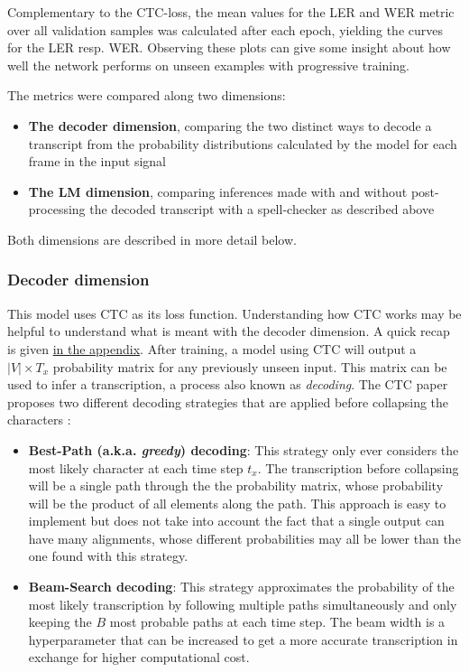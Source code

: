 Complementary to the \ac{CTC}-loss, the mean values for the \ac{LER} and \ac{WER} metric over all validation samples was calculated after each epoch, yielding the curves for the \ac{LER} resp. \ac{WER}. Observing these plots can give some insight about how well the network performs on unseen examples with progressive training.

The metrics were compared along two dimensions:

\begin{itemize}
	\item \textbf{The decoder dimension}, comparing the two distinct ways to decode a transcript from the probability distributions calculated by the model for each frame in the input signal
	\item \textbf{The LM dimension}, comparing inferences made with and without post-processing the decoded transcript with a spell-checker as described above
\end{itemize}

Both dimensions are described in more detail below.

\subsubsection{Decoder dimension}

This model uses \ac{CTC} as its loss function. Understanding how \ac{CTC} works may be helpful to understand what is meant with the decoder dimension. A quick recap is given \hyperref[ctc-summary]{in the appendix}. After training, a model using \ac{CTC} will output a $|V| \times T_x$ probability matrix for any previously unseen input. This matrix can be used to infer a transcription, a process also known as \textit{decoding}. The \ac{CTC} paper proposes two different decoding strategies that are applied before collapsing the characters \cite{ctc_paper}:

\begin{itemize}
	\item \textbf{Best-Path (a.k.a. \textit{greedy}) decoding}: This strategy only ever considers the most likely character at each time step $t_x$. The transcription before collapsing will be a single path through the the probability matrix, whose probability will be the product of all elements along the path. This approach is easy to implement but does not take into account the fact that a single output can have many alignments, whose different probabilities may all be lower than the one found with this strategy.
	\item \textbf{Beam-Search decoding}: This strategy approximates the probability of the most likely transcription by following multiple paths simultaneously and only keeping the $B$ most probable paths at each time step. The beam width is a hyperparameter that can be increased to get a more accurate transcription in exchange for higher computational cost.
\end{itemize}

